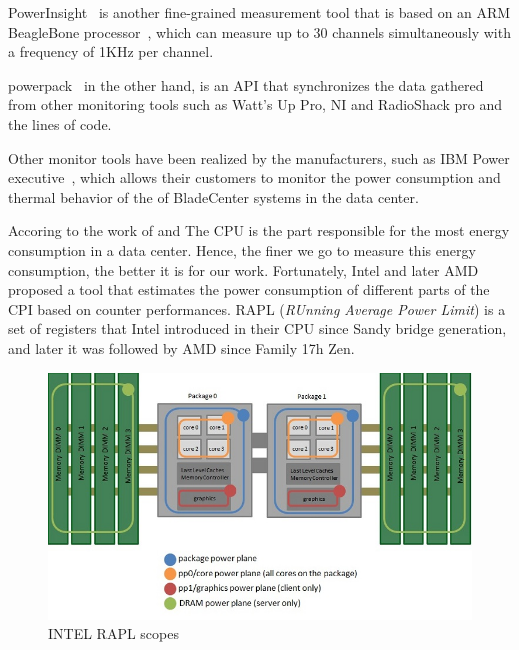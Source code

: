PowerInsight~\cite{laros2013powerinsight} is another fine-grained measurement tool that is based on an ARM BeagleBone processor~\cite{coley2012beaglebone}, which can measure up to 30 channels simultaneously with a frequency of 1KHz per channel.

powerpack~\cite{ge2009powerpack} in the other hand, is an API that synchronizes the data gathered from other monitoring tools such as Watt’s Up Pro, NI and RadioShack pro and the lines of code. %

Other monitor tools have been realized by the manufacturers, such as IBM Power executive~\cite{koomey2011growth}, which allows their customers to monitor the power consumption and thermal behavior of the of BladeCenter systems in the data center.


Accoring to the work of \citeauthor{vasques2019review} and\citeauthor{wang2018modelling}
The CPU is the part responsible for the most energy consumption in a data center\cite{vasques2019review,wang2018modelling}. Hence, the finer we go to measure this energy consumption, the better it is for our work.
Fortunately, Intel and later AMD proposed a tool that estimates the power consumption of different parts of the CPI based on counter performances.
RAPL (\emph{RUnning Average Power Limit}) \cite{hackenberg2013power,hackenberg2015energy} is a set of registers that Intel introduced in their CPU since Sandy bridge generation, and later it was followed by AMD since Family 17h Zen.


\begin{figure}[!hbt]
    \centering
    \includegraphics[width=0.8\linewidth]{imgs/power-planes-rapl}
    \caption{INTEL RAPL scopes
    }\label{fig:rapl-domaine}
\end{figure}

